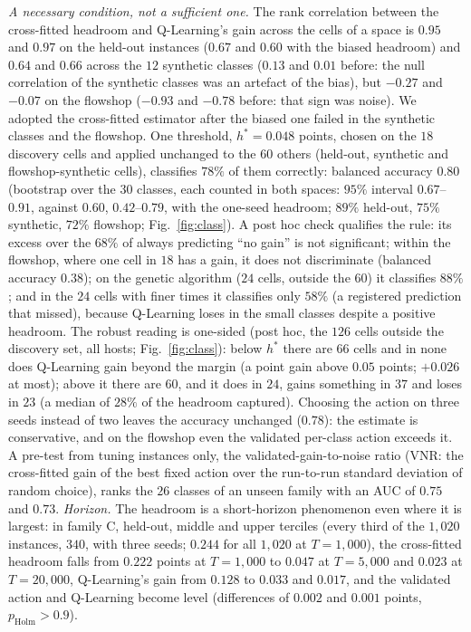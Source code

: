 \documentclass[conference,a4paper]{IEEEtran}
\begin{document}
\emph{A necessary condition, not a sufficient one.} The rank correlation between the cross-fitted headroom and Q-Learning's gain across the cells of a space is $0.95$ and $0.97$ on the held-out instances ($0.67$ and $0.60$ with the biased headroom) and $0.64$ and $0.66$ across the $12$ synthetic classes ($0.13$ and $0.01$ before: the null correlation of the synthetic classes was an artefact of the bias), but $-0.27$ and $-0.07$ on the flowshop ($-0.93$ and $-0.78$ before: that sign was noise). We adopted the cross-fitted estimator after the biased one failed in the synthetic classes and the flowshop.
One threshold, $h^*=0.048$ points, chosen on the $18$ discovery cells and applied unchanged to the $60$ others (held-out, synthetic and flowshop-synthetic cells), classifies $78\%$ of them correctly: balanced accuracy $0.80$ (bootstrap over the $30$ classes, each counted in both spaces: $95\%$ interval $0.67$--$0.91$, against $0.60$, $0.42$--$0.79$, with the one-seed headroom; $89\%$ held-out, $75\%$ synthetic, $72\%$ flowshop; Fig.~\ref{fig:class}). A post hoc check qualifies the rule: its excess over the $68\%$ of always predicting ``no gain'' is not significant; within the flowshop, where one cell in $18$ has a gain, it does not discriminate (balanced accuracy $0.38$); on the genetic algorithm ($24$ cells, outside the $60$) it classifies $88\%$; and in the $24$ cells with finer times it classifies only $58\%$ (a registered prediction that missed), because Q-Learning loses in the small classes despite a positive headroom.
The robust reading is one-sided (post hoc, the $126$ cells outside the discovery set, all hosts; Fig.~\ref{fig:class}): below $h^*$ there are $66$ cells and in none does Q-Learning gain beyond the margin (a point gain above $0.05$ points; $+0.026$ at most); above it there are $60$, and it does in $24$, gains something in $37$ and loses in $23$ (a median of $28\%$ of the headroom captured). Choosing the action on three seeds instead of two leaves the accuracy unchanged ($0.78$): the estimate is conservative, and on the flowshop even the validated per-class action exceeds it.
A pre-test from tuning instances only, the validated-gain-to-noise ratio (VNR: the cross-fitted gain of the best fixed action over the run-to-run standard deviation of random choice), ranks the $26$ classes of an unseen family with an AUC of $0.75$ and $0.73$.
\emph{Horizon.} The headroom is a short-horizon phenomenon even where it is largest: in family C, held-out, middle and upper terciles (every third of the $1{,}020$ instances, $340$, with three seeds; $0.244$ for all $1{,}020$ at $T=1{,}000$), the cross-fitted headroom falls from $0.222$ points at $T=1{,}000$ to $0.047$ at $T=5{,}000$ and $0.023$ at $T=20{,}000$, Q-Learning's gain from $0.128$ to $0.033$ and $0.017$, and the validated action and Q-Learning become level (differences of $0.002$ and $0.001$ points, $p_{\mathrm{Holm}}>0.9$).
\end{document}
